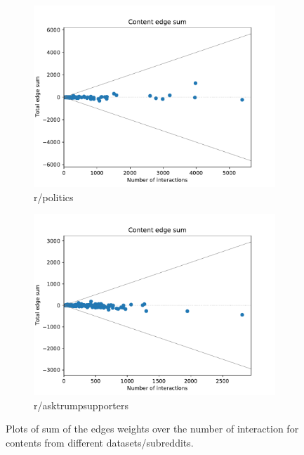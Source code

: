 \begin{figure}
\begin{center}
		\begin{subfigure}[b]{0.4\textwidth}
			\centering
			\includegraphics[width=\textwidth]{tex/out/politics200/edge-sum-n-interactions.pdf}
			\caption{r/politics}
			\label{fig:tex/out/politics200/edge-sum-n-interactions.pdf}
		\end{subfigure}
		\begin{subfigure}[b]{0.4\textwidth}
			\centering
			\includegraphics[width=\textwidth]{tex/out/asktrumpsupporters200/edge-sum-n-interactions.pdf}
			\caption{r/asktrumpsupporters}
			\label{fig:tex/out/covid19200/edge-sum-n-interactions.pdf}
		\end{subfigure}
	\end{center}
	\caption[Sum edges over number of interactions for many datasets]{Plots of
		sum of the edges weights over the number of interaction for contents
		from different datasets/subreddits.}
	\label{fig:edge-sum-n-interactions}
\end{figure}

